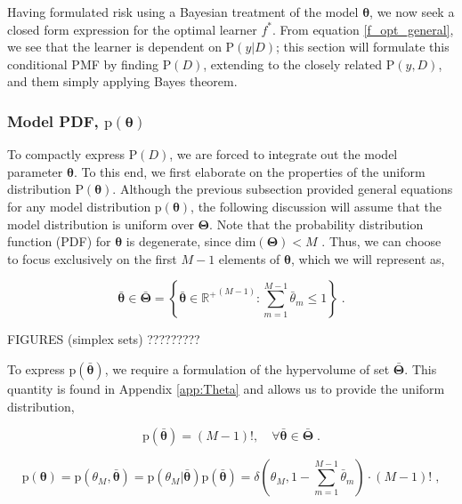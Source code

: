 \documentclass[12pt]{article}
\begin{document}
Having formulated risk using a Bayesian treatment of the model $\bm{\theta}$, we now seek a closed form expression for the optimal learner $f^*$. From equation \eqref{f_opt_general}, we see that the learner is dependent on $\text{P}(y|D)$; this section will formulate this conditional PMF by finding $\text{P}(D)$, extending to the closely related $\text{P}(y,D)$, and them simply applying Bayes theorem.


\subsubsection{Model PDF, $\text{p}(\bm{\theta})$}

To compactly express $\text{P}(D)$, we are forced to integrate out the model parameter $\bm{\theta}$. To this end, we first elaborate on the properties of the uniform distribution $\text{P}(\bm{\theta})$. Although the previous subsection provided general equations for any model distribution $\text{p}(\bm{\theta})$, the following discussion will assume that the model distribution is uniform over $\bm{\Theta}$. Note that the probability distribution function (PDF) for $\bm{\theta}$ is degenerate, since $\text{dim}(\bm{\Theta}) < M$ . Thus, we can choose to focus exclusively on the first $M-1$ elements of $\bm{\theta}$, which we will represent as,

\begin{equation}
\bar{\bm{\theta}} \in \bar{\bm{\Theta}} = \left\{ \bar{\bm{\theta}} \in {\mathbb{R}^+}^{(M-1)}: \sum_{m=1}^{M-1} \bar{\theta}_m \leq 1 \right\} \;.
\end{equation}

FIGURES (simplex sets) ?????????

To express $\text{p}\left(\bar{\bm{\theta}}\right)$, we require a formulation of the hypervolume of set $\bar{\bm{\Theta}}$. This quantity is found in Appendix \ref{app:Theta} and allows us to provide the uniform distribution,

\begin{equation}
\text{p}\left(\bar{\bm{\theta}}\right)= (M-1)!,  \quad \forall \bar{\bm{\theta}} \in \bar{\bm{\Theta}} \;.
\end{equation}

\begin{equation}
\text{p}(\bm{\theta}) = \text{p}(\theta_M,\bar{\bm{\theta}}) = \text{p}\left( \theta_M | \bar{\bm{\theta}} \right) \text{p}\left(\bar{\bm{\theta}}\right)
= \delta\left( \theta_M,1-\sum_{m=1}^{M-1} \bar{\theta}_m \right) \cdot  (M-1)! \;,
\end{equation}
\end{document}
